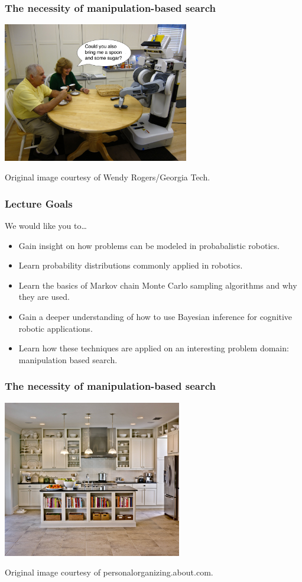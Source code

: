 \begin{frame}
  \frametitle{The necessity of manipulation-based search}
  \begin{center}
    \includegraphics[width=3.2in]{img/robot_in_kitchen.jpg}

    \tiny{Original image courtesy of Wendy Rogers/Georgia Tech.}
  \end{center}
\end{frame}

\begin{frame}
  \frametitle{Lecture Goals}
  We would like you to\ldots
  \begin{itemize}
    \item Gain insight on how problems can be modeled in probabalistic robotics.
    \item Learn probability distributions commonly applied in robotics.
    \item Learn the basics of Markov chain Monte Carlo sampling algorithms and
      why they are used.
    \item Gain a deeper understanding of how to use Bayesian inference for
      cognitive robotic applications.
    \item Learn how these techniques are applied on an interesting problem domain:
      manipulation based search.
  \end{itemize}
\end{frame}

\begin{frame}
  \frametitle{The necessity of manipulation-based search}
  \begin{center}
    \includegraphics[height=2.7in]{img/kitchen-organization-fake.jpg}

    \tiny{Original image courtesy of personalorganizing.about.com.}
  \end{center}
\end{frame}

